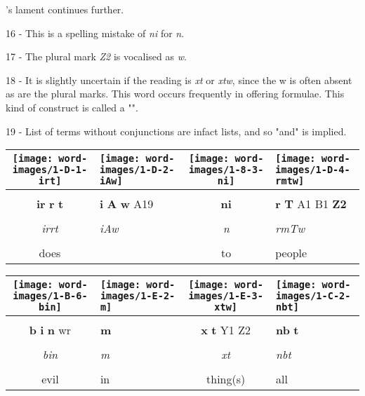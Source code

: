 \vspace*{\fill}

\pagebreak

\vspace*{\fill}

's lament continues further.

\vspace*{\fill}

16 - This is a spelling mistake of \textit{ni} for \textit{n}.

17 - The plural mark \textit{Z2} is vocalised as \textit{w}.

18 - It is slightly uncertain if the reading is \textit{xt} or \textit{xtw}, since the w is often absent as are the plural marks. This word occurs frequently in offering formulae. This kind of construct is called a "".

19 - List of terms without conjunctions are infact lists, and so "and" is implied.

\vspace*{\fill}

\pagebreak


\vspace*{\fill}

\begin{tabularx}{\linewidth}{cYcY}
	\texttt{[image: word-images/1-D-1-irt]} &
	\texttt{[image: word-images/1-D-2-iAw]} &
	\texttt{[image: word-images/1-8-3-ni]} &
	\texttt{[image: word-images/1-D-4-rmtw]} \\
	\hline \\ 
	\textbf{ir} \textbf{r} \textbf{t} &
	\textbf{i} \textbf{A} \textbf{w} A19 &
	\textbf{ni} &
	\textbf{r} \textbf{T} A1 B1 \textbf{Z2} \\
	\hline \\ 
	\textit{irrt} & \textit{iAw} & \textit{n} & \textit{rmTw} \\
	\hline \\ 
	does &  & to & people
\end{tabularx}

\vspace{7.5mm}

\begin{tabularx}{\linewidth}{cYcY}
	\texttt{[image: word-images/1-B-6-bin]} &
	\texttt{[image: word-images/1-E-2-m]} &
	\texttt{[image: word-images/1-E-3-xtw]} &
	\texttt{[image: word-images/1-C-2-nbt]} \\
	\hline \\ 
	\textbf{b} \textbf{i} \textbf{n} wr &
	\textbf{m} &
	\textbf{x} \textbf{t} Y1 Z2 &
	\textbf{nb} \textbf{t} \\
	\hline \\ 
	\textit{bin} & \textit{m} & \textit{xt} & \textit{nbt} \\
	\hline \\ 
	evil & in & thing(s) & all
\end{tabularx}

